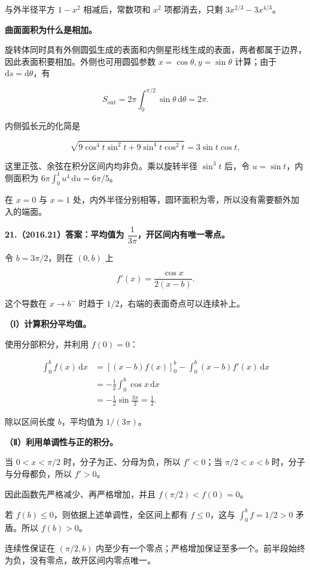 \documentclass[UTF8,11pt,fontset=windows]{ctexart}
\begin{document}
与外半径平方 $1-x^2$ 相减后，常数项和 $x^2$ 项都消去，只剩 $3x^{2/3}-3x^{4/3}$。

\textbf{曲面面积为什么是相加。}

旋转体同时具有外侧圆弧生成的表面和内侧星形线生成的表面，两者都属于边界，因此表面积要相加。外侧也可用圆弧参数 $x=\cos\theta,y=\sin\theta$ 计算；由于 $\mathrm ds=\mathrm d\theta$，有

$$
S_{\mathrm{out}}=2\pi\int_0^{\pi/2}\sin\theta\,\mathrm d\theta=2\pi.
$$

内侧弧长元的化简是

$$
\sqrt{9\cos^4t\sin^2t+9\sin^4t\cos^2t}
=3\sin t\cos t,
$$

这里正弦、余弦在积分区间内均非负。乘以旋转半径 $\sin^3t$ 后，令 $u=\sin t$，内侧面积为 $6\pi\int_0^1u^4\,\mathrm du=6\pi/5$。

在 $x=0$ 与 $x=1$ 处，内外半径分别相等，圆环面积为零，所以没有需要额外加入的端面。

\clearpage

\textbf{21.（2016.21）答案：平均值为 $\dfrac1{3\pi}$，开区间内有唯一零点。}

令 $b=3\pi/2$，则在 $(0,b)$ 上

$$
f'(x)=\frac{\cos x}{2(x-b)}.
$$

这个导数在 $x\to b^-$ 时趋于 $1/2$，右端的表面奇点可以连续补上。

\textbf{（Ⅰ）计算积分平均值。}

使用分部积分，并利用 $f(0)=0$：

$$
\begin{aligned}
\int_0^b f(x)\,\mathrm dx
&=[(x-b)f(x)]_0^b-\int_0^b(x-b)f'(x)\,\mathrm dx\\
&=-\frac12\int_0^b\cos x\,\mathrm dx\\
&=-\frac12\sin\frac{3\pi}{2}=\frac12.
\end{aligned}
$$

除以区间长度 $b$，平均值为 $1/(3\pi)$。

\textbf{（Ⅱ）利用单调性与正的积分。}

当 $0<x<\pi/2$ 时，分子为正、分母为负，所以 $f'<0$；当 $\pi/2<x<b$ 时，分子与分母都负，所以 $f'>0$。

因此函数先严格减少、再严格增加，并且 $f(\pi/2)<f(0)=0$。

若 $f(b)\le0$，则依据上述单调性，全区间上都有 $f\le0$，这与 $\int_0^b f=1/2>0$ 矛盾。所以 $f(b)>0$。

连续性保证在 $(\pi/2,b)$ 内至少有一个零点；严格增加保证至多一个。前半段始终为负，没有零点，故开区间内零点唯一。
\end{document}
